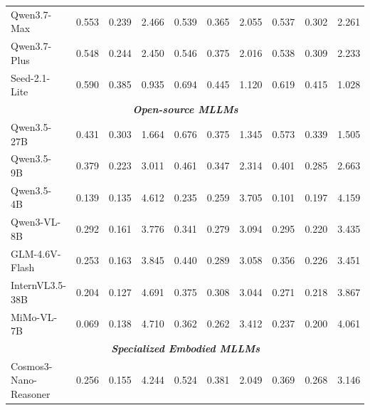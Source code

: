 \begin{table}[t]
\begin{tabular}{@{}l ccc ccc cc c@{}}
Qwen3.7-Max~\citep{qwen2026qwen37plus}
& 0.553 & 0.239 & 2.466
& 0.539 & 0.365 & 2.055
& 0.537 & 0.302 & 2.261 \\

Qwen3.7-Plus~\citep{qwen2026qwen37plus}
& 0.548 & 0.244 & 2.450
& 0.546 & 0.375 & 2.016
& 0.538 & 0.309 & 2.233 \\

Seed-2.1-Lite~\citep{seed2026seed21}
& 0.590 & 0.385 & 0.935
& 0.694 & 0.445 & 1.120
& 0.619 & 0.415 & 1.028 \\


\midrule
\multicolumn{10}{c}{\textit{\textbf{Open-source MLLMs}}}\\
\midrule
Qwen3.5-27B~\citep{qwen2026qwen35}
& 0.431 & 0.303 & 1.664
& 0.676 & 0.375 & 1.345
& 0.573 & 0.339 & 1.505 \\

Qwen3.5-9B~\citep{qwen2026qwen35}
& 0.379 & 0.223 & 3.011
& 0.461 & 0.347 & 2.314
& 0.401 & 0.285 & 2.663 \\

Qwen3.5-4B~\citep{qwen2026qwen35}
& 0.139 & 0.135 & 4.612
& 0.235 & 0.259 & 3.705
& 0.101 & 0.197 & 4.159 \\

Qwen3-VL-8B~\citep{bai2025qwen3vl}
& 0.292 & 0.161 & 3.776
& 0.341 & 0.279 & 3.094
& 0.295 & 0.220 & 3.435 \\

GLM-4.6V-Flash~\citep{vteam2025glm45vglm41vthinkingversatilemultimodal}
& 0.253 & 0.163 & 3.845
& 0.440 & 0.289 & 3.058
& 0.356 & 0.226 & 3.451 \\

InternVL3.5-38B~\citep{wang2025internvl3_5}
& 0.204 & 0.127 & 4.691
& 0.375 & 0.308 & 3.044
& 0.271 & 0.218 & 3.867 \\

MiMo-VL-7B~\citep{coreteam2025mimovltechnicalreport}
& 0.069 & 0.138 & 4.710
& 0.362 & 0.262 & 3.412
& 0.237 & 0.200 & 4.061 \\

\midrule
\multicolumn{10}{c}{\textit{\textbf{Specialized Embodied MLLMs}}}\\
\midrule
Cosmos3-Nano-Reasoner~\citep{nvidia2026cosmos3}
& 0.256 & 0.155 & 4.244
& 0.524 & 0.381 & 2.049
& 0.369 & 0.268 & 3.146 \\


\end{tabular}
\end{table}
